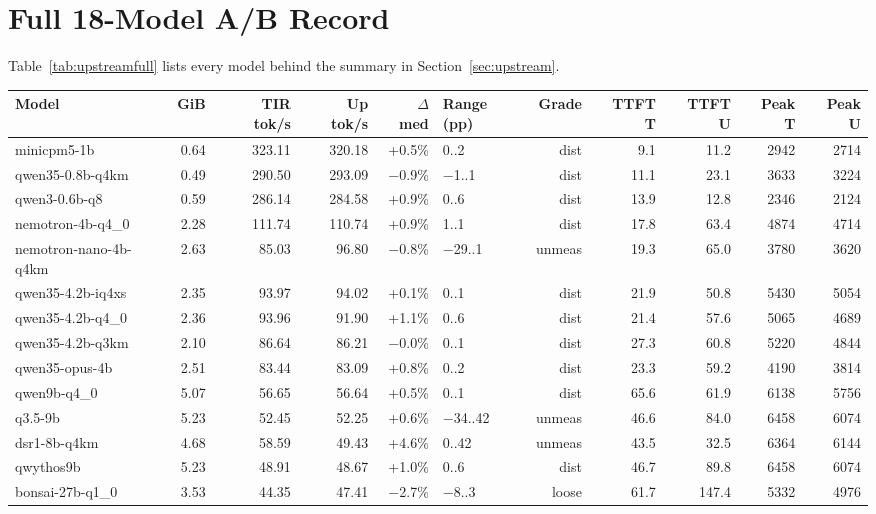 \documentclass[letterpaper,twocolumn,10pt]{article}
\begin{document}
\section{Full 18-Model A/B Record}
\label{app:abfull}

Table~\ref{tab:upstreamfull} lists every model behind the summary in
Section~\ref{sec:upstream}.

\begin{table}[t]
\centering
\scriptsize
\setlength{\tabcolsep}{3.2pt}
\begin{tabular}{@{}lrrrrlrrrrr@{}}
\toprule
Model & GiB & TIR tok/s & Up tok/s & $\Delta$ med & Range (pp) & Grade & TTFT T & TTFT U & Peak T & Peak U \\
\midrule
minicpm5-1b & 0.64 & 323.11 & 320.18 & +0.5\% & 0..2 & dist & 9.1 & 11.2 & 2942 & 2714 \\
qwen35-0.8b-q4km & 0.49 & 290.50 & 293.09 & $-$0.9\% & $-$1..1 & dist & 11.1 & 23.1 & 3633 & 3224 \\
qwen3-0.6b-q8 & 0.59 & 286.14 & 284.58 & +0.9\% & 0..6 & dist & 13.9 & 12.8 & 2346 & 2124 \\
nemotron-4b-q4\_0 & 2.28 & 111.74 & 110.74 & +0.9\% & 1..1 & dist & 17.8 & 63.4 & 4874 & 4714 \\
nemotron-nano-4b-q4km & 2.63 & 85.03 & 96.80 & $-$0.8\% & $-$29..1 & unmeas & 19.3 & 65.0 & 3780 & 3620 \\
qwen35-4.2b-iq4xs & 2.35 & 93.97 & 94.02 & +0.1\% & 0..1 & dist & 21.9 & 50.8 & 5430 & 5054 \\
qwen35-4.2b-q4\_0 & 2.36 & 93.96 & 91.90 & +1.1\% & 0..6 & dist & 21.4 & 57.6 & 5065 & 4689 \\
qwen35-4.2b-q3km & 2.10 & 86.64 & 86.21 & $-$0.0\% & 0..1 & dist & 27.3 & 60.8 & 5220 & 4844 \\
qwen35-opus-4b & 2.51 & 83.44 & 83.09 & +0.8\% & 0..2 & dist & 23.3 & 59.2 & 4190 & 3814 \\
qwen9b-q4\_0 & 5.07 & 56.65 & 56.64 & +0.5\% & 0..1 & dist & 65.6 & 61.9 & 6138 & 5756 \\
q3.5-9b & 5.23 & 52.45 & 52.25 & +0.6\% & $-$34..42 & unmeas & 46.6 & 84.0 & 6458 & 6074 \\
dsr1-8b-q4km & 4.68 & 58.59 & 49.43 & +4.6\% & 0..42 & unmeas & 43.5 & 32.5 & 6364 & 6144 \\
qwythos9b & 5.23 & 48.91 & 48.67 & +1.0\% & 0..6 & dist & 46.7 & 89.8 & 6458 & 6074 \\
bonsai-27b-q1\_0 & 3.53 & 44.35 & 47.41 & $-$2.7\% & $-$8..3 & loose & 61.7 & 147.4 & 5332 & 4976 \\

\end{tabular}
\end{table}
\end{document}
